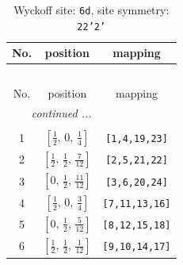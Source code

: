 \documentclass[fleqn,8pt]{jsarticle}
\begin{document}
\renewcommand{\arraystretch}{1.2}
\begin{longtable}{ccc}
\caption{Wyckoff site: {\tt 6d}, site symmetry: {\tt 22'2'}}
 \\
 \hline \hline
No. & position & mapping \\ \hline \endfirsthead

\multicolumn{2}{l}{\tablename\ \thetable{}} \\
 \hline \hline
No. & position & mapping \\ \hline \endhead

 \hline \hline
\multicolumn{2}{r}{\footnotesize\it continued ...} \\ \endfoot

 \hline \hline
\multicolumn{2}{r}{} \\ \endlastfoot

1 & $\left[ \frac{1}{2},\, 0,\, \frac{1}{4} \right]$ & {\tt [1,4,19,23]} \\ \hline
2 & $\left[ \frac{1}{2},\, \frac{1}{2},\, \frac{7}{12} \right]$ & {\tt [2,5,21,22]} \\ \hline
3 & $\left[ 0,\, \frac{1}{2},\, \frac{11}{12} \right]$ & {\tt [3,6,20,24]} \\ \hline
4 & $\left[ \frac{1}{2},\, 0,\, \frac{3}{4} \right]$ & {\tt [7,11,13,16]} \\ \hline
5 & $\left[ 0,\, \frac{1}{2},\, \frac{5}{12} \right]$ & {\tt [8,12,15,18]} \\ \hline
6 & $\left[ \frac{1}{2},\, \frac{1}{2},\, \frac{1}{12} \right]$ & {\tt [9,10,14,17]} \\
\end{longtable}
\renewcommand{\arraystretch}{1.2}
\end{document}

